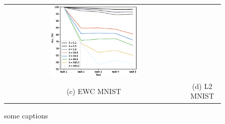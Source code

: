 \documentclass[final]{cvpr}
\begin{document}
\begin{figure}[t]
\begin{tabular}{c@{\hskip0.5cm}c}
        \includegraphics[width=0.5\textwidth]{resources/l2_MNIST.eps}\\%
		(c) EWC MNIST  & (d) L2 MNIST \\
	\end{tabular}\vspace{0.2cm}
	\caption{some captions}
	\label{fig:tsne}
\end{figure}



{\small
	
	
}
\end{document}
